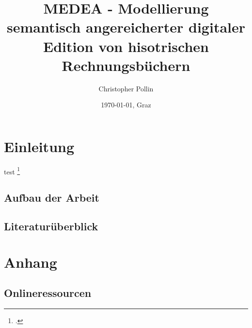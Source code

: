 \documentclass[12pt,a4paper]{article}
\author{Christopher Pollin}
\title{MEDEA - Modellierung semantisch angereicherter digitaler Edition von hisotrischen Rechnungsbüchern}
\date{\today{}, Graz}
\begin{document}

\tableofcontents

\newpage
{}

\section{Einleitung}
\label{sec:Einleitung}

test \footcite[Vgl.][S.]{tomasek2013encoding}

\subsection{Aufbau der Arbeit}
\label{subsec:Aufbau}

\subsection{Literaturüberblick}
\label{subsec:Literaturueberblick}


\newpage
\section{Anhang}
\label{sec:Anhang}


\newpage

\subsection{Onlineressourcen}
\label{subsec:Onlineressourcen}
\end{document}
